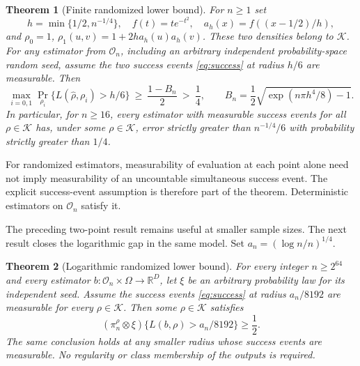 \documentclass[11pt]{article}
\newtheorem{theorem}{Theorem}[section]
\theoremstyle{remark}
\newcommand{\R}{\mathbb R}
\newcommand{\K}{\mathcal K}
\begin{document}
\begin{theorem}[Finite randomized lower bound]\label{thm:lower}
For $n\ge1$ set
\[
 h=\min\{1/2,n^{-1/4}\},\quad f(t)=t e^{-t^2},\quad
 a_h(x)=f((x-1/2)/h),
\]
and $\rho_0=1$, $\rho_1(u,v)=1+2h a_h(u)a_h(v)$.
These two densities belong to $\K$. For any estimator from
$\mathcal O_n$, including an arbitrary independent probability-space
random seed, assume the two success events \eqref{eq:success} at radius
$h/6$ are measurable. Then
\begin{equation}\label{eq:lower}
 \max_{i=0,1}\Pr_{\rho_i}\{L(\widehat\rho,\rho_i)>h/6\}
 \ \ge\ \frac{1-B_n}{2}\ >\ \frac14,\qquad
 B_n=\frac12\sqrt{\exp(n\pi h^4/8)-1}.
\end{equation}
In particular, for $n\ge16$, every estimator with measurable success
events for all $\rho\in\K$ has, under some $\rho\in\K$, error strictly
greater than $n^{-1/4}/6$ with probability strictly greater than $1/4$.
\end{theorem}
For randomized estimators, measurability of evaluation at each point
alone need not imply measurability of an uncountable simultaneous
success event. The explicit success-event assumption is therefore part
of the theorem. Deterministic estimators on $\mathcal O_n$ satisfy it.

The preceding two-point result remains useful at smaller sample sizes.
The next result closes the logarithmic gap in the same model. Set
$a_n=(\log n/n)^{1/4}$.

\begin{theorem}[Logarithmic randomized lower bound]\label{thm:loglower}
For every integer $n\ge2^{64}$ and every estimator
$b:\mathcal O_n\times\Omega\to\R^D$, let $\xi$ be an arbitrary
probability law for its independent seed. Assume the success events
\eqref{eq:success} at radius $a_n/8192$ are measurable for every
$\rho\in\K$. Then some $\rho\in\K$ satisfies
\begin{equation}\label{eq:loglower}
 (\pi_n^\rho\otimes\xi)\{L(b,\rho)>a_n/8192\}\ge\frac12.
\end{equation}
The same conclusion holds at any smaller radius whose success events
are measurable. No regularity or class membership of the outputs is
required.
\end{theorem}
\end{document}
